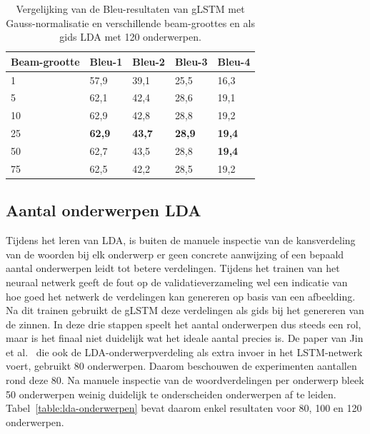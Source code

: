     \begin{table}
    	\centering
    	\begin{tabular}{lllll}
    		Beam-grootte & Bleu-1 & Bleu-2 & Bleu-3 & Bleu-4  \\ \hline
    		1	      & 57,9   & 39,1   & 25,5   & 16,3        \\ 
    		5         & 62,1   & 42,4   & 28,6   & 19,1     \\
    		10        & 62,9   & 42,8   & 28,8   & 19,2    \\
    		25        & \textbf{62,9}   & \textbf{43,7}   & \textbf{28,9}   & \textbf{19,4}     \\
    		50		  & 62,7   & 43,5   & 28,8   & \textbf{19,4}    \\
    		75        & 62,5   & 42,2   & 28,5   & 19,2    \\ \hline
    	\end{tabular}
    	\caption{Vergelijking van de Bleu-resultaten van gLSTM met Gauss-normalisatie en verschillende beam-groottes en als gids LDA met 120 onderwerpen.}	
    	\label{table:beam_gauss}
    \end{table}

\subsection{Aantal onderwerpen LDA}
Tijdens het leren van LDA, is buiten de manuele inspectie van de kansverdeling van de woorden bij elk onderwerp er geen concrete aanwijzing of een bepaald aantal onderwerpen leidt tot betere verdelingen.
Tijdens het trainen van het neuraal netwerk geeft de fout op de validatieverzameling wel een indicatie van hoe goed het netwerk de verdelingen kan genereren op basis van een afbeelding.
Na dit trainen gebruikt de gLSTM deze verdelingen als gids bij het genereren van de zinnen.
In deze drie stappen speelt het aantal onderwerpen dus steeds een rol, maar is het finaal niet duidelijk wat het ideale aantal precies is.
De paper van Jin et al.~\cite{Jin2015} die ook de LDA-onderwerpverdeling als extra invoer in het LSTM-netwerk voert, gebruikt 80 onderwerpen.
Daarom beschouwen de experimenten aantallen rond deze 80. Na manuele inspectie van de woordverdelingen per onderwerp bleek 50 onderwerpen weinig duidelijk te onderscheiden onderwerpen af te leiden.
Tabel~\ref{table:lda-onderwerpen} bevat daarom enkel resultaten voor 80, 100 en 120 onderwerpen.

